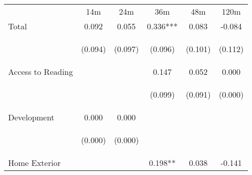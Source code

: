 \begin{tabular}{lccccc}
\hline \noalign{\smallskip} & 14m & 24m & 36m & 48m & 120m\\
\noalign{\smallskip}\hline \noalign{\smallskip}Total & 0.092 & 0.055 & 0.336*** & 0.083 & -0.084\\
 & \begin{footnotesize}(0.094)\end{footnotesize} & \begin{footnotesize}(0.097)\end{footnotesize} & \begin{footnotesize}(0.096)\end{footnotesize} & \begin{footnotesize}(0.101)\end{footnotesize} & \begin{footnotesize}(0.112)\end{footnotesize}\\
\noalign{\smallskip}Access to Reading &  &  & 0.147 & 0.052 & 0.000\\
 & \begin{footnotesize}\end{footnotesize} & \begin{footnotesize}\end{footnotesize} & \begin{footnotesize}(0.099)\end{footnotesize} & \begin{footnotesize}(0.091)\end{footnotesize} & \begin{footnotesize}(0.000)\end{footnotesize}\\
\noalign{\smallskip}Development & 0.000 & 0.000 &  &  & \\
 & \begin{footnotesize}(0.000)\end{footnotesize} & \begin{footnotesize}(0.000)\end{footnotesize} & \begin{footnotesize}\end{footnotesize} & \begin{footnotesize}\end{footnotesize} & \begin{footnotesize}\end{footnotesize}\\
\noalign{\smallskip}Home Exterior &  &  & 0.198** & 0.038 & -0.141\\

\end{tabular}
